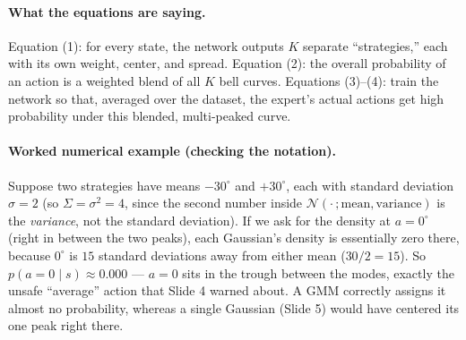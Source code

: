 \documentclass[11pt]{article}
\begin{document}
\paragraph{What the equations are saying.}
Equation (1): for every state, the network outputs $K$ separate ``strategies,'' each
with its own weight, center, and spread. Equation (2): the overall probability of an
action is a weighted blend of all $K$ bell curves. Equations (3)--(4): train the network
so that, averaged over the dataset, the expert's actual actions get high probability
under this blended, multi-peaked curve.

\paragraph{Worked numerical example (checking the notation).}
Suppose two strategies have means $-30^\circ$ and $+30^\circ$, each with standard
deviation $\sigma = 2$ (so $\Sigma = \sigma^2 = 4$, since the second number inside
$\mathcal{N}(\cdot\,;\text{mean},\text{variance})$ is the \emph{variance}, not the
standard deviation). If we ask for the density at $a=0^\circ$ (right in between the two
peaks), each Gaussian's density is essentially zero there, because $0^\circ$ is $15$
standard deviations away from either mean ($30/2 = 15$). So $p(a=0\mid s)\approx 0.000$
--- $a=0$ sits in the trough between the modes, exactly the unsafe ``average'' action
that Slide 4 warned about. A GMM correctly assigns it almost no probability, whereas a
single Gaussian (Slide 5) would have centered its one peak right there.
\end{document}
